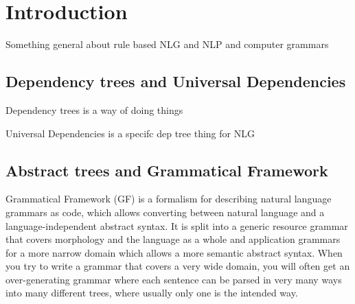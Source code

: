 \documentclass{article}
\begin{document}



\section{Introduction}
Something general about rule based NLG and NLP
and computer grammars

\subsection{Dependency trees and Universal Dependencies}
Dependency trees is a way of doing things

Universal Dependencies is a specifc dep tree thing for NLG


\subsection{Abstract trees and Grammatical Framework}

Grammatical Framework\cite{ranta-2004} (GF) is a formalism for describing natural language grammars as code, which allows converting between natural language and a language-independent abstract syntax. It is split into a generic resource grammar that covers morphology and the language as a whole and application grammars for a more narrow domain which allows a more semantic abstract syntax. When you try to write a grammar that covers a very wide domain, you will often get an over-generating grammar where each sentence can be parsed in very many ways into many different trees, where usually only one is the intended way.
\end{document}
